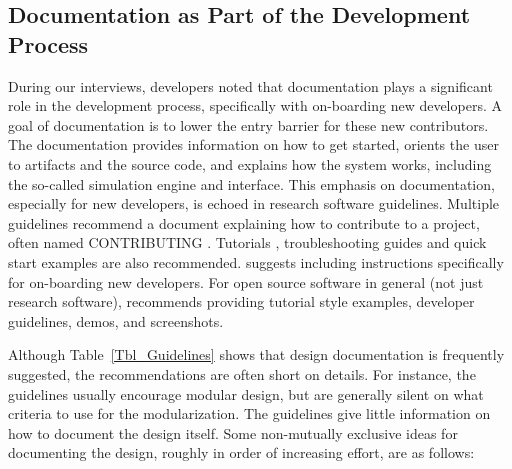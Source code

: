 \documentclass[final, 3p, times, authoryear]{elsarticle}
\begin{document}
\subsection{Documentation as Part of the Development Process}

During our interviews, developers noted that documentation plays a significant
role in the development process, specifically with on-boarding new developers. A
goal of documentation is to lower the entry barrier for these new contributors.
The documentation provides information on how to get started, orients the user
to artifacts and the source code, and explains how the system works, including
the so-called simulation engine and interface.  This emphasis on documentation,
especially for new developers, is echoed in research software guidelines.
Multiple guidelines recommend a document explaining how to contribute to a
project, often named CONTRIBUTING \citep{Yo2021, BrettEtAl2021, WilsonEtAl2016,
ThielEtAl2020, vanGompelEtAl2016, OrvizEtAl2017, FLOSS2022, JimenezEtAl2017}.
Tutorials \citep{ThielEtAl2020}, troubleshooting guides \citep{OrvizEtAl2017,
SSI2022} and quick start examples \citep{ThielEtAl2020, vanGompelEtAl2016} are
also recommended.  \citet{SmithAndRoscoe2018} suggests including instructions
specifically for on-boarding new developers. For open source software in general
(not just research software), \citet{Fogel2005} recommends providing tutorial
style examples, developer guidelines, demos, and screenshots.

Although Table~\ref{Tbl_Guidelines} shows that design documentation is
frequently suggested, the recommendations are often short on details. For
instance, the guidelines usually encourage modular design, but are generally
silent on what criteria to use for the modularization.  The guidelines give
little information on how to document the design itself. Some non-mutually
exclusive ideas for documenting the design, roughly in order of increasing
effort, are as follows:
\end{document}
